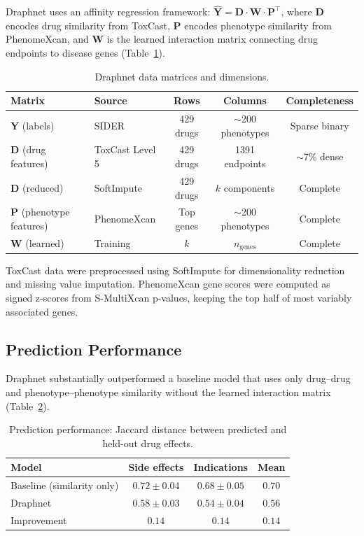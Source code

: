 \documentclass[11pt]{article}
\begin{document}
Draphnet uses an affinity regression framework: $\hat{\mathbf{Y}} = \mathbf{D} \cdot \mathbf{W} \cdot \mathbf{P}^\top$, where $\mathbf{D}$ encodes drug similarity from ToxCast, $\mathbf{P}$ encodes phenotype similarity from PhenomeXcan, and $\mathbf{W}$ is the learned interaction matrix connecting drug endpoints to disease genes (Table~\ref{tab:matrices}).

\begin{table}[H]
\centering
\caption{Draphnet data matrices and dimensions.}
\label{tab:matrices}
\begin{tabular}{llccc}
\toprule
\textbf{Matrix} & \textbf{Source} & \textbf{Rows} & \textbf{Columns} & \textbf{Completeness} \\
\midrule
$\mathbf{Y}$ (labels) & SIDER & 429 drugs & ${\sim}$200 phenotypes & Sparse binary \\
$\mathbf{D}$ (drug features) & ToxCast Level 5 & 429 drugs & 1391 endpoints & ${\sim}$7\% dense \\
$\mathbf{D}$ (reduced) & SoftImpute & 429 drugs & $k$ components & Complete \\
$\mathbf{P}$ (phenotype features) & PhenomeXcan & Top genes & ${\sim}$200 phenotypes & Complete \\
$\mathbf{W}$ (learned) & Training & $k$ & $n_\mathrm{genes}$ & Complete \\
\bottomrule
\end{tabular}
\end{table}

ToxCast data were preprocessed using SoftImpute \citep{mazumder2010softimpute} for dimensionality reduction and missing value imputation. PhenomeXcan gene scores were computed as signed z-scores from S-MultiXcan p-values, keeping the top half of most variably associated genes.

\subsection{Prediction Performance}

Draphnet substantially outperformed a baseline model that uses only drug--drug and phenotype--phenotype similarity without the learned interaction matrix (Table~\ref{tab:prediction}).

\begin{table}[H]
\centering
\caption{Prediction performance: Jaccard distance between predicted and held-out drug effects.}
\label{tab:prediction}
\begin{tabular}{lccc}
\toprule
\textbf{Model} & \textbf{Side effects} & \textbf{Indications} & \textbf{Mean} \\
\midrule
Baseline (similarity only) & $0.72 \pm 0.04$ & $0.68 \pm 0.05$ & $0.70$ \\
Draphnet & $\mathbf{0.58 \pm 0.03}$ & $\mathbf{0.54 \pm 0.04}$ & $\mathbf{0.56}$ \\
Improvement & $0.14$ & $0.14$ & $0.14$ \\
\bottomrule
\end{tabular}
\end{table}
\end{document}
